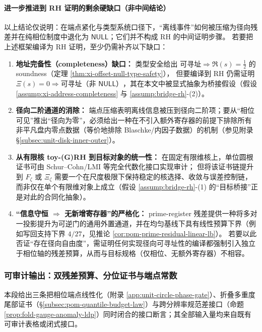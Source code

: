 \paragraph{进一步推进到 RH 证明的剩余硬缺口（非中间结论）}
以上结论仅说明：在端点紧化与类型系统口径下，“离线事件”如何被压缩为径向残差并在纯相位制度中退化为 \(\mathsf{NULL}\)；它们并不构成 RH 的中间证明步骤。
若要把上述框架编译为 RH 证明，至少仍需补齐以下缺口：
\begin{enumerate}
  \item \textbf{地址完备性（completeness）缺口：}
  类型安全给出 \(\text{可寻址}\Rightarrow \Re(s)=\tfrac12\) 的 soundness（定理 \ref{thm:xi-offset-null-type-safety}），
  但要编译到 RH 仍需证明 \(\Xi(s)=0\Rightarrow \text{可寻址（非 }\mathsf{NULL}\text{）}\)，其在本文中被显式抽象为桥接假设（假设 \ref{assump:xi-address-completeness} 与 \ref{assump:bridge-rh}-(2)）。
  \item \textbf{径向二阶通道的消除：}
  端点压缩表明离线信息被压到径向二阶项；要从“相位可见”推出“径向为零”，必须给出一种在不引入额外寄存器的前提下排除所有非平凡盘内零点数据（等价地排除 Blaschke/内因子数据）的机制（参见附录 \S\ref{subsec:unit-disk-inner-outer}）。
  \item \textbf{从有限核 toy-(G)RH 到目标对象的统一性：}
  在固定有限维核上，单位圆根证书可由 Schur--Cohn/LMI 等完全代数化接口实现审计；
  但将该证书链提升到 \(F_\zeta\) 或 \(\Xi_\zeta\) 需要一个在尺度极限下保持稳定的核选择、收敛与误差控制链，而非仅在单个有限维对象上成立（假设 \ref{assump:bridge-rh}-(1) 的“目标桥接”正是对此的合同化抽象）。
  \item \textbf{“信息守恒 \(\Rightarrow\) 无新增寄存器”的严格化：}
  prime-register 残差提供一种将多对一投影提升为可逆门的通用外置通道，并在均匀基线下具有线性预算下界（例如写回支持下界 \(4/27\)，见推论 \ref{cor:pom-prime-residual-linear-lb}）。
  若要以此否证“存在径向自由度”，需证明任何实现径向可寻址性的编译都强制引入独立于相位轴的残差预算，从而与目标规格（仅相位、无额外寄存器）不相容。
\end{enumerate}

\subsubsection{可审计输出：双残差预算、分位证书与端点常数}\label{subsubsec:unit-circle-phase-auditable-outputs}
本段给出三条把相位端点线性化（附录 \ref{app:unit-circle-phase-gate}）、折叠多重度尾部证书（\S\ref{subsec:pom-quantile-budget-law}）与跨分辨率规范差接口（命题 \ref{prop:fold-gauge-anomaly-ldp}）同时闭合的接口断言；其全部输入量均来自既有可审计表格或闭式接口。

